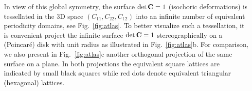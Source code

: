 \documentclass[aps,
superscriptaddress,notitlepage]{revtex4-1}
\begin{document}
  In view  of this global symmetry, the surface $\det{\bf C}=1$ (isochoric deformations) is tessellated  in the 3D space $(C_{11}, C_{22}, C_{12})$   into an infinite number of equivalent periodicity domains, see Fig.~\ref{fig:atlas}. To better visualize such a tessellation, it is convenient project the infinite surface $\det{\bf C}=1$ stereographically on a (Poincar\'e) disk with unit radius as illustrated in Fig.~\ref{fig:atlas}b. For comparison, we also present in Fig.~\ref{fig:atlas}c another orthogonal projection of the same surface   on  a  plane.  In both projections the equivalent square lattices are indicated by small black squares while red dots denote equivalent triangular (hexagonal) lattices.
\begin{figure}[ht!]
\begin{center}
\hspace{0.5cm}

\end{center}
\end{figure}
\end{document}
